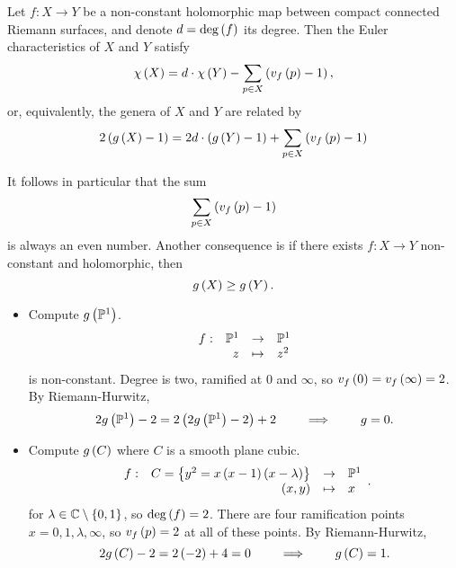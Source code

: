 \begin{theorem}
Let $ f : X \to Y $ be a non-constant holomorphic map between compact connected Riemann surfaces, and denote $ d = \deg\left( f \right) $ its degree. Then the Euler characteristics of $ X $ and $ Y $ satisfy
$$ \chi\left( X \right) = d \cdot \chi\left( Y \right) - \sum_{p \in X} \left( v_f\left( p \right) - 1 \right), $$
or, equivalently, the genera of $ X $ and $ Y $ are related by
$$ 2\left( g\left( X \right) - 1 \right) = 2d \cdot \left( g\left( Y \right) - 1 \right) + \sum_{p \in X} \left( v_f\left( p \right) - 1 \right) $$
\end{theorem}

\pagebreak

\begin{remark}
It follows in particular that the sum
$$ \sum_{p \in X} \left( v_f\left( p \right) - 1 \right) $$
is always an even number. Another consequence is if there exists $ f : X \to Y $ non-constant and holomorphic, then
$$ g\left( X \right) \ge g\left( Y \right). $$
\end{remark}

\begin{example*}
\hfill
\begin{itemize}
\item Compute $ g\left( \mathbb{P}^1 \right) $.
$$ \function[f]{\P^1}{\P^1}{z}{z^2} $$
is non-constant. Degree is two, ramified at $ 0 $ and $ \infty $, so $ v_f\left( 0 \right) = v_f\left( \infty \right) = 2 $. By Riemann-Hurwitz,
$$ 2g\left( \mathbb{P}^1 \right) - 2 = 2\left( 2g\left( \mathbb{P}^1 \right) - 2 \right) + 2 \qquad \implies \qquad g = 0. $$
\item Compute $ g\left( C \right) $ where $ C $ is a smooth plane cubic.
$$ \function[f]{C = \cb{y^2 = x\rb{x - 1}\rb{x - \lambda}}}{\P^1}{\rb{x, y}}{x}. $$
for $ \lambda \in \mathbb{C} \setminus \left\{ 0, 1 \right\} $, so $ \deg\left( f \right) = 2 $. There are four ramification points $ x = 0, 1, \lambda, \infty $, so $ v_f\left( p \right) = 2 $ at all of these points. By Riemann-Hurwitz,
$$ 2g\left( C \right) - 2 = 2\left( -2 \right) + 4 = 0 \qquad \implies \qquad g\left( C \right) = 1. $$
\end{itemize}
\end{example*}

